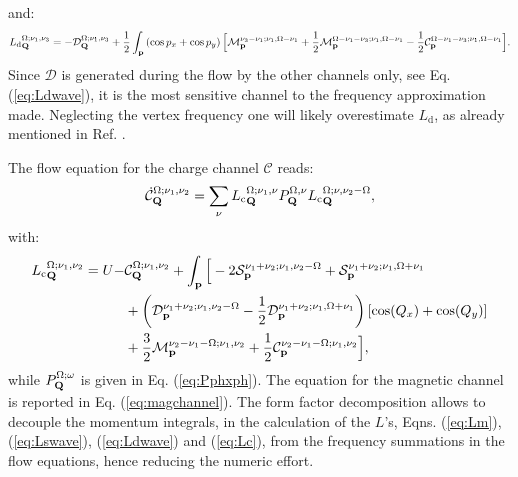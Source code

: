 and: 
\begin{align} 
\label{eq:Ldwave}
{L_\mathrm{d}}^{\Omega;\nu_1,\nu_3}_{\mathbf{Q}}=-\mathcal{D}_{\mathbf{Q}}^{\Omega;\nu_1,\nu_3} 
+ \frac{1}{2}\int_{\mathbf{p}} \left(\cos{p_x}+\cos{p_y}\right) \Big[ \mathcal{M}_{\mathbf{p}}^{\nu_3-\nu_1;\nu_1,\Omega-\nu_1} + \frac{1}{2} \mathcal{M}_{\mathbf{p}}^{\Omega-\nu_1-\nu_3;\nu_1,\Omega-\nu_1} - \frac{1}{2} \mathcal{C}_{\mathbf{p}}^{\Omega-\nu_1-\nu_3;\nu_1,\Omega-\nu_1} \Big].
\end{align}	 
Since $\mathcal{D}$ is generated during the flow by the other channels only, see Eq. (\ref{eq:Ldwave}), it is the most sensitive channel to the frequency approximation made.  
Neglecting the vertex frequency one will likely overestimate $L_{\mathrm{d}}$, as already mentioned in Ref. .

The flow equation for the charge channel $\mathcal{C}$ reads:
\begin{equation}
\dot{\mathcal{C}}_{\mathbf{Q}}^{\Omega;\nu_1,\nu_2} = \sum_{\nu}{L_\mathrm{c}}^{\Omega; \nu_1,\nu}_{\mathbf{Q}} P_{\mathbf{Q}}^{\Omega,\nu} {L_\mathrm{c}}^{\Omega; \nu,\nu_2-\Omega}_{\mathbf{Q}}, 
\end{equation} 	   
with: 
 \begin{align} 
 \label{eq:Lc}
{L_\mathrm{c}}^{\Omega;\nu_1,\nu_2}_{\mathbf{Q}}=U-&\mathcal{C}_{\mathbf{Q}}^{\Omega;\nu_1,\nu_2} 
+ \int_{\mathbf{p}} \Big [
- 2 \mathcal{S}_{\mathbf{p}}^{\nu_1+\nu_2;\nu_1,\nu_2-\Omega} + \mathcal{S}_{\mathbf{p}}^{\nu_1+\nu_2;\nu_1,\Omega+\nu_1}
\\ &+ \left( \mathcal{D}_{\mathbf{p}}^{\nu_1+\nu_2;\nu_1,\nu_2-\Omega} -\frac{1}{2} \mathcal{D}_{\mathbf{p}}^{\nu_1+\nu_2;\nu_1,\Omega+\nu_1} \right) [\cos(Q_x)+\cos(Q_y)]
\\ &+ \frac{3}{2} \mathcal{M}_{\mathbf{p}}^{\nu_2-\nu_1-\Omega;\nu_1,\nu_2} 
+ \frac{1}{2} \mathcal{C}_{\mathbf{p}}^{\nu_2-\nu_1-\Omega;\nu_1,\nu_2} \Big],
\end{align}
while $P_{\mathbf{Q}}^{\Omega;\omega}$ is given in Eq. (\ref{eq:Pphxph}).
The equation for the magnetic channel is reported in Eq. (\ref{eq:magchannel}).
The form factor decomposition allows to decouple the momentum integrals, in the calculation of the $L$'s, Eqns. (\ref{eq:Lm}), (\ref{eq:Lswave}), (\ref{eq:Ldwave}) and (\ref{eq:Lc}), from the frequency summations in the flow equations, hence reducing the numeric effort.   	 



